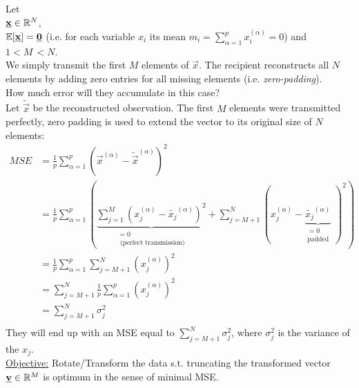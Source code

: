Let\\[0.2cm]
$\underline{\mathbf{x}} \in \mathbb{R}^N$,\\
$\mathbb{E}[\underline{\mathbf{x}}] = \underline{\mathbf{0}}$ (i.e. for each variable $x_i$ its mean $m_i = \sum_{\alpha=1}^{p} x_i^{(\alpha)} = 0$) and $1 < M\, < N$.\\[0.2cm]
We simply transmit the first $M$ elements of $\vec x$. The recipient reconstructs all $N$ elements by adding zero entries for all missing elements (i.e. \textit{zero-padding}).\\[0.2cm]
How much error will they accumulate in this case?\\[0.2cm]
Let $\widetilde{\vec{x}}$ be the reconstructed observation. The first $M$ elements were transmitted perfectly, zero padding is used to extend the vector to its original size of $N$ elements:
\begin{align*}
MSE  &=  \frac{1}{p} \sum\limits_{\alpha = 1}^p ( \vec{x}^{(\alpha)} - \widetilde{\vec{x}}^{(\alpha)} )^2\\
     &=  \frac{1}{p} \sum\limits_{\alpha = 1}^p \left(\underbrace{\sum\limits_{j = 1}^M ( x_j^{(\alpha)} - \widetilde{x_j}^{(\alpha)} )^2}_{\substack{=0 \\\text{ (perfect transmission)}}} + \sum\limits_{j = M+1}^N ( x_j^{(\alpha)} - \underbrace{\widetilde{x_j}^{(\alpha)}}_{\substack{=0\\ \text{padded}}}\;)^2 \right)\\
     &=  \frac{1}{p} \sum\limits_{\alpha = 1}^p \sum\limits_{j = M+1}^N ( x_j^{(\alpha)} )^2 \\
     &=  \sum\limits_{j = M+1}^N \frac{1}{p} \sum\limits_{\alpha = 1}^p  ( x_j^{(\alpha)} )^2 \\
     &=  \sum\limits_{j = M+1}^N \sigma_j^2 \\
\end{align*}
They will end up with an MSE equal to $\sum_{j=M+1}^{N} \sigma_j^2$, where $\sigma_j^2$ is the variance of the $x_j$.\\

\underline{Objective:} Rotate/Transform the data s.t. truncating the transformed vector $\underline{\mathbf{v}} \in \mathbb{R}^M$ is optimum in the sense of minimal MSE.

\newpage
